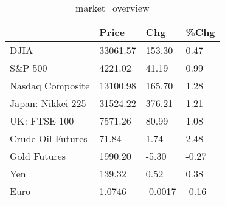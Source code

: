\documentclass{article}%
\begin{document}
%


\begin{table}[htbp]%
\caption{market\_overview}%
\centering%
\begin{adjustbox}{width=1\textwidth}%
\begin{tabular}{llll}
\toprule
                  &    Price &     Chg &  \%Chg \\
\midrule
             DJIA & 33061.57 &  153.30 &  0.47 \\
          S\&P 500 &  4221.02 &   41.19 &  0.99 \\
 Nasdaq Composite & 13100.98 &  165.70 &  1.28 \\
Japan: Nikkei 225 & 31524.22 &  376.21 &  1.21 \\
     UK: FTSE 100 &  7571.26 &   80.99 &  1.08 \\
Crude Oil Futures &    71.84 &    1.74 &  2.48 \\
     Gold Futures &  1990.20 &   -5.30 & -0.27 \\
              Yen &   139.32 &    0.52 &  0.38 \\
             Euro &   1.0746 & -0.0017 & -0.16 \\
\bottomrule
\end{tabular}
%
\end{adjustbox}%
\end{table}

%
\end{document}
